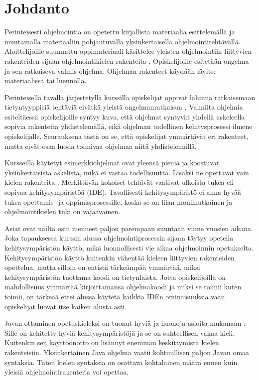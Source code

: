 \section{Johdanto}

Perinteisesti ohjelmointia on opetettu kirjallista materiaalia esittelemällä ja
muutamalla materiaaliin pohjautuvalla yksinkertaisella ohjelmointitehtävällä.
Aloittelijoille suunnattu oppimateriaali käsittelee yleisten ohjelmointiin
liittyvien rakenteiden sijaan ohjelmointikielen rakenteita
\cite{Caspersen:2006:NPO:1176617.1176741, Vihavainen:2011:EAM:1953163.1953196}.
Opiskelijoille esitetään ongelma ja sen ratkaiseva valmis ohjelma. Ohjelman
rakenteet käydään lävitse materiaalissa tai luennolla.

Perinteisellä tavalla järjestetyllä kurssilla opiskelijat oppivat lähinnä
ratkaisemaan tietyntyyppisiä tehtäviä eivätkä yleistä ongelmanratkaisua
\cite{Gries:1974:WTI:953057.810447}. Valmiita ohjelmia esiteltäessä
opiskelijoille syntyy kuva, että ohjelmat syntyvät yhdellä askeleella sopivia
rakenteita yhdistelemällä, eikä ohjelman todellinen kehitysprosessi ilmene
opiskelijalle.  Seurauksena tästä on se, että opiskelijat ymmärtävät eri
rakenteet, mutta eivät osaa luoda toimivaa ohjelmaa niitä yhdistelemällä.

Kursseilla käytetyt esimerkkiohjelmat ovat yleensä pieniä ja koostuvat
yksinkertaisista askelista, mikä ei vastaa todellisuutta. Lisäksi ne opettavat
vain kielen rakenteita \cite{Astrachan:1995:ACA:199691.199694}. Merkittävän
kokoiset tehtävät vaativat ulkoista tukea \cite{Kolling:2008} eli sopivaa
kehitysympäristöä (IDE). Tavallisesti kehitysympäristö ei anna hyvää tukea
opettamis- ja oppimisprosessille, koska se on liian monimutkainen ja
ohjelmointikielen tuki on vajaavainen.

Asiat ovat näiltä osin menneet paljon parempaan suuntaan viime vuosien aikana.
Joka tapauksessa kurssin alussa ohjelmointiprosessin sijaan täytyy opetella
kehitysympäristön käyttö, mikä luonnollisesti vie aikaa ohjelmoinnin
opetukselta. Kehitysympäristön käyttö kuitenkin vähentää kieleen liittyvien
rakenteiden opettelua, mutta silloin on entistä tärkeämpää ymmärtää, miksi
kehitysympäristön tuottama koodi on tietynlaista. Jotta opiskelijoilla on
mahdollisuus ymmärtää kirjoittamansa ohjelmakoodi ja miksi se toimii kuten
toimii, on tärkeää ettei alussa käytetä kaikkia IDEn ominaisuuksia vaan
opiskelijat luovat itse kaiken alusta asti.

Javan ottaminen opetuskieleksi on tuonut hyviä ja huonoja asioita mukanaan
\cite{Kolling:2008}. Sille on kehitetty hyviä kehitysympäristöjä ja se on
suhteellisen vakaa kieli. Kuitenkin sen käyttöönotto on lisännyt enemmän
keskittymistä kielen rakenteisiin. Yksinkertainen Java ohjelma vaatii
kohtuullisen paljon Javan omaa syntaksia. Täten kielen syntaksia on osattava
kohtalainen määrä ennen kuin yleisiä ohjelmointirakenteita voi opettaa.

